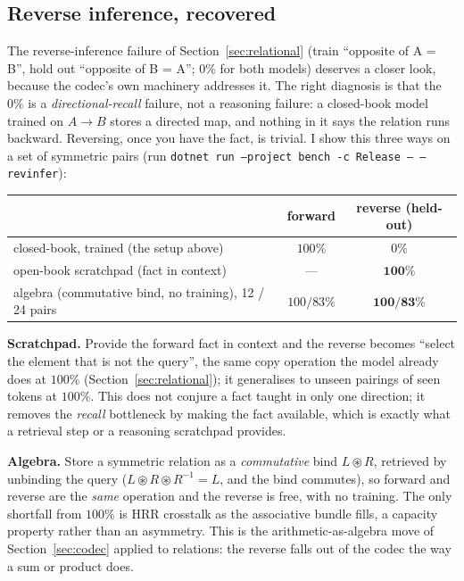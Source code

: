 \documentclass[11pt]{article}
\newcommand{\bind}{\mathbin{\circledast}}         %
\newcommand{\code}[1]{\texttt{#1}}
\begin{document}
\subsection{Reverse inference, recovered}\label{sec:revinfer}

The reverse-inference failure of Section~\ref{sec:relational} (train ``opposite of A = B'', hold out
``opposite of B = A''; $0\%$ for both models) deserves a closer look, because the codec's own machinery
addresses it. The right diagnosis is that the $0\%$ is a \emph{directional-recall} failure, not a
reasoning failure: a closed-book model trained on $A\!\to\!B$ stores a directed map, and nothing in it
says the relation runs backward. Reversing, once you have the fact, is trivial. I show this three ways on
a set of symmetric pairs (run \code{dotnet run --project bench -c Release -- --revinfer}):

\begin{center}
\begin{tabular}{@{}lcc@{}}
\toprule
 & forward & reverse (held-out) \\
\midrule
closed-book, trained (the setup above)         & $100\%$    & $0\%$ \\
open-book scratchpad (fact in context)         & ---        & $\mathbf{100\%}$ \\
algebra (commutative bind, no training), 12 / 24 pairs & $100/83\%$ & $\mathbf{100/83\%}$ \\
\bottomrule
\end{tabular}
\end{center}

\textbf{Scratchpad.} Provide the forward fact in context and the reverse becomes ``select the element
that is not the query'', the same copy operation the model already does at $100\%$
(Section~\ref{sec:relational}); it generalises to unseen pairings of seen tokens at $100\%$. This does
not conjure a fact taught in only one direction; it removes the \emph{recall} bottleneck by making the
fact available, which is exactly what a retrieval step or a reasoning scratchpad provides.

\textbf{Algebra.} Store a symmetric relation as a \emph{commutative} bind $L \bind R$, retrieved by
unbinding the query ($L\bind R\bind R^{-1} = L$, and the bind commutes), so forward and reverse are the
\emph{same} operation and the reverse is free, with no training. The only shortfall from $100\%$ is HRR
crosstalk as the associative bundle fills, a capacity property rather than an asymmetry. This is the
arithmetic-as-algebra move of Section~\ref{sec:codec} applied to relations: the reverse falls out of the
codec the way a sum or product does.
\end{document}
